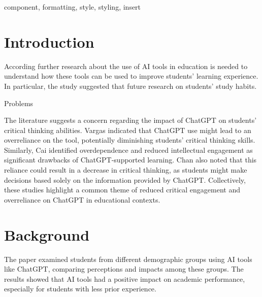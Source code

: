 \documentclass[conference]{IEEEtran}
\begin{document}
\begin{abstract}
This document is a model and instructions for \LaTeX.
This and the IEEEtran.cls file define the components of your paper [title, text, heads, etc.]. *CRITICAL: Do Not Use Symbols, Special Characters, Footnotes, 
or Math in Paper Title or Abstract.
\end{abstract}

\begin{IEEEkeywords}
component, formatting, style, styling, insert
\end{IEEEkeywords}

\section{Introduction}


According \cite{Kwan24} further research about the use of AI tools in
education is needed to understand how these tools can be used to improve
students' learning experience. In particular, the study suggested that future
research on students' study habits.

Problems

The literature suggests a concern regarding the impact of ChatGPT on students'
critical thinking abilities. Vargas \cite{Vargas2023} indicated that
ChatGPT use might lead to an overreliance on the tool, potentially diminishing
students' critical thinking skills. Similarly, Cai \cite{cai23} identified
overdependence and reduced intellectual engagement as significant drawbacks of
ChatGPT-supported learning. Chan \cite{chan23} also noted that this
reliance could result in a decrease in critical thinking, as students might make
decisions based solely on the information provided by ChatGPT. Collectively,
these studies highlight a common theme of reduced critical engagement and
overreliance on ChatGPT in educational contexts.







\section{Background}

The paper \cite{Kwan24} examined students from different demographic groups
using AI tools like ChatGPT, comparing perceptions and impacts
among these groups. The results showed that AI tools had a positive impact on
academic performance, especially for students with less prior experience.
\end{document}

